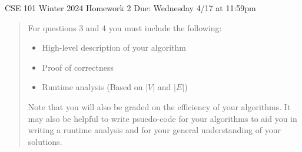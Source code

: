 \documentclass[10pt,letterpaper,unboxed,cm]{article}
\begin{document}
\hfill{CSE 101 Winter 2024}
\hfill{Homework 2}
\hfill{Due: Wednesday 4/17 at 11:59pm}



\begin{quote}
For questions 3 and 4 you must include the following:
\begin{itemize}
\item
High-level description of your algorithm
\item
Proof of correctness
\item
Runtime analysis (Based on $|V|$ and $|E|$)
\end{itemize}
Note that you will also be graded on the efficiency of your algorithms.  It may also be helpful to write psuedo-code for your algorithms to aid you in writing a runtime analysis and for your general understanding of your solutions.

\end{quote}
\end{document}

